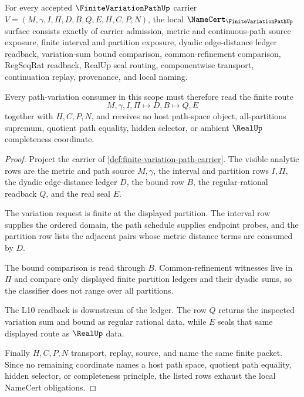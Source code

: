 \begin{theorem}
\label{thm:finite-variation-path-namecert-obligations}
For every accepted $\FiniteVariationPathUp$ carrier $V=(M,\gamma,I,\Pi,D,B,Q,E,H,C,P,N)$, the local $\NameCert_{\FiniteVariationPathUp}$ surface consists exactly of carrier admission, metric and continuous-path source exposure, finite interval and partition exposure, dyadic edge-distance ledger readback, variation-sum bound comparison, common-refinement comparison, RegSeqRat readback, RealUp seal routing, componentwise transport, continuation replay, provenance, and local naming.

Every path-variation consumer in this scope must therefore read the finite route
$$
M,\gamma,I,\Pi
\longmapsto
D,B
\longmapsto
Q,E
$$
together with $H,C,P,N$, and receives no host path-space object, all-partitions supremum, quotient path equality, hidden selector, or ambient $\RealUp$ completeness coordinate.
\end{theorem}
\begin{proof}
Project the carrier of \autoref{def:finite-variation-path-carrier}. The visible analytic rows are the metric and path source $M,\gamma$, the interval and partition rows $I,\Pi$, the dyadic edge-distance ledger $D$, the bound row $B$, the regular-rational readback $Q$, and the real seal $E$.

The variation request is finite at the displayed partition. The interval row supplies the ordered domain, the path schedule supplies endpoint probes, and the partition row lists the adjacent pairs whose metric distance terms are consumed by $D$.

The bound comparison is read through $B$. Common-refinement witnesses live in $\Pi$ and compare only displayed finite partition ledgers and their dyadic sums, so the classifier does not range over all partitions.

The L10 readback is downstream of the ledger. The row $Q$ returns the inspected variation sum and bound as regular rational data, while $E$ seals that same displayed route as $\RealUp$ data.

Finally $H,C,P,N$ transport, replay, source, and name the same finite packet. Since no remaining coordinate names a host path space, quotient path equality, hidden selector, or completeness principle, the listed rows exhaust the local NameCert obligations.
\end{proof}

